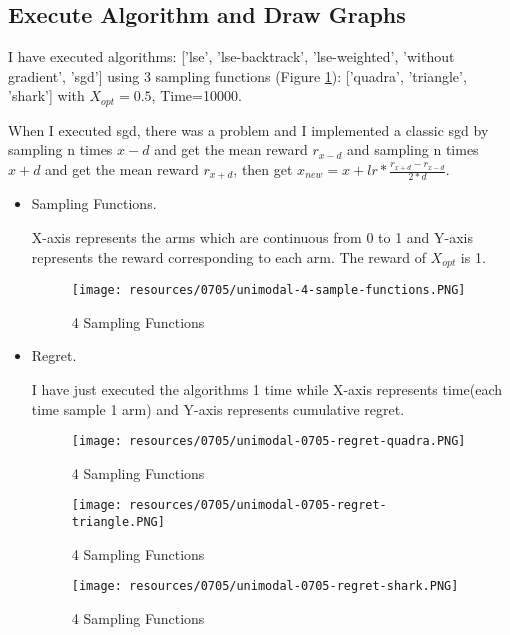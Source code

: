 \subsection*{Execute Algorithm and Draw Graphs}


I have executed algorithms: ['lse', 'lse-backtrack', 'lse-weighted', 'without gradient', 'sgd'] using 3 sampling functions (Figure \ref{unimodal-4-sample-functions}): ['quadra', 'triangle', 'shark'] with $X_{opt} = 0.5$, Time=10000.

	When I executed sgd, there was a problem and I implemented a classic sgd by sampling n times $x-d$ and get the mean reward $r_{x-d}$ and sampling n times $x+d$ and get the mean reward $r_{x+d}$, then get $x_{new} = x + lr*\frac{r_{x+d} - r_{x-d}}{2*d}$.

\begin{itemize}
	\item Sampling Functions.
	
	X-axis represents the arms which are continuous from 0 to 1 and Y-axis 			represents the reward corresponding to each arm. The reward of $X_{opt}$ is 1.
	
	\begin{figure}[h]
	\center
	\texttt{[image: resources/0705/unimodal-4-sample-functions.PNG]}
	\caption{4 Sampling Functions}
	\label{unimodal-4-sample-functions}
	\end{figure}

	\item Regret.
	
	I have just executed the algorithms 1 time while X-axis represents time(each time sample 1 arm) and Y-axis represents cumulative regret.
	
	\begin{figure}[h]
	\center
	\texttt{[image: resources/0705/unimodal-0705-regret-quadra.PNG]}
	\caption{4 Sampling Functions}
	\label{unimodal-0705-regret-quadra}
	\end{figure}
	
	\begin{figure}[h]
	\center
	\texttt{[image: resources/0705/unimodal-0705-regret-triangle.PNG]}
	\caption{4 Sampling Functions}
	\label{unimodal-0705-regret-triangle}
	\end{figure}
	\begin{figure}[h]
	\center
	\texttt{[image: resources/0705/unimodal-0705-regret-shark.PNG]}
	\caption{4 Sampling Functions}
	\label{unimodal-0705-regret-shark}
	\end{figure}
	

\end{itemize}
